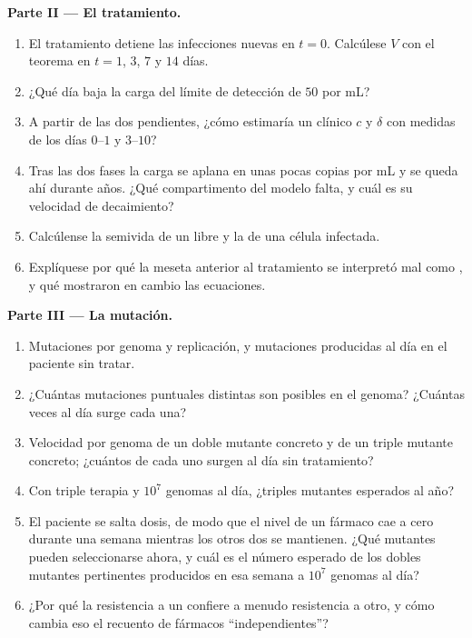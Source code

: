 \begin{problem}
\medskip
\noindent\textbf{Parte II --- El tratamiento.}
\begin{enumerate}[resume]
  \item El tratamiento detiene las infecciones nuevas en $t = 0$.
        Calcúlese $V$ con el teorema en $t =
        1$, $3$, $7$ y $14$ días.
  \item ¿Qué día baja la carga del límite de detección de $50$ por mL?
  \item A partir de las dos pendientes, ¿cómo estimaría un clínico $c$ y
        $\delta$ con medidas de los días $0$--$1$ y $3$--$10$?
  \item Tras las dos fases la carga se aplana en unas pocas copias por mL
        y se queda ahí durante años. ¿Qué compartimento del modelo falta,
        y cuál es su velocidad de decaimiento?
  \item Calcúlense la semivida de un  libre y la de una célula
        infectada.
  \item Explíquese por qué la meseta anterior al tratamiento se
        interpretó mal como , y qué mostraron en cambio las
        ecuaciones.
\end{enumerate}

\medskip
\noindent\textbf{Parte III --- La mutación.}
\begin{enumerate}[resume]
  \item Mutaciones por genoma y replicación, y mutaciones producidas al
        día en el paciente sin tratar.
  \item ¿Cuántas mutaciones puntuales distintas son posibles en el
        genoma? ¿Cuántas veces al día surge cada una?
  \item Velocidad por genoma de un doble mutante concreto y de un triple
        mutante concreto; ¿cuántos de cada uno surgen al día sin
        tratamiento?
  \item Con triple terapia y $10^{7}$ genomas al día, ¿triples mutantes
        esperados al año?
  \item El paciente se salta dosis, de modo que el nivel de un fármaco
        cae a cero durante una semana mientras los otros dos se
        mantienen. ¿Qué mutantes pueden seleccionarse ahora, y cuál es el
        número esperado de los dobles mutantes pertinentes producidos en
        esa semana a $10^{7}$ genomas al día?
  \item ¿Por qué la resistencia a un  confiere a
        menudo resistencia a otro, y cómo cambia eso el recuento de
        fármacos ``independientes''?
\end{enumerate}


\end{problem}
